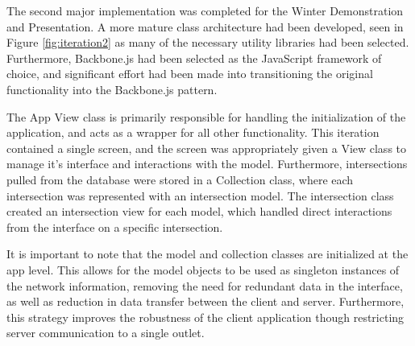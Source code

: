 \documentclass{report}
\begin{document}
The second major implementation was completed for the Winter Demonstration and Presentation. A more mature class architecture had been developed, seen in Figure \ref{fig:iteration2} as many of the necessary utility libraries had been selected. Furthermore, Backbone.js had been selected as the JavaScript framework of choice, and significant effort had been made into transitioning the original functionality into the Backbone.js pattern.

The App View class is primarily responsible for handling the initialization of the application, and acts as a wrapper for all other functionality. This iteration contained a single screen, and the screen was appropriately given a View class to manage it's interface and interactions with the model. Furthermore, intersections pulled from the database were stored in a Collection class, where each intersection was represented with an intersection model. The intersection class created an intersection view for each model, which handled direct interactions from the interface on a specific intersection. 

It is important to note that the model and collection classes are initialized at the app level. This allows for the model objects to be used as singleton instances of the network information, removing the need for redundant data in the interface, as well as reduction in data transfer between the client and server. Furthermore, this strategy improves the robustness of the client application though restricting server communication to a single outlet.
\end{document}
